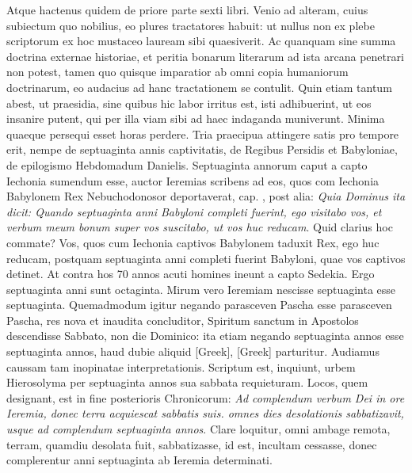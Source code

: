 Atque hactenus quidem de
priore parte sexti libri.
Venio ad alteram, cuius subiectum quo nobilius,
eo plures tractatores habuit: ut nullus non ex plebe scriptorum
ex hoc mustaceo lauream sibi quaesiverit.
Ac quanquam sine
summa doctrina externae historiae, et peritia bonarum literarum
ad ista arcana penetrari non potest, tamen quo quisque imparatior
ab omni copia humaniorum doctrinarum, eo audacius ad hanc
tractationem se contulit.
Quin etiam tantum abest, ut praesidia,
sine quibus hic labor irritus est, isti adhibuerint, ut eos insanire
putent, qui per illa viam sibi ad haec indaganda muniverunt.
Minima quaeque persequi esset horas perdere.
Tria praecipua attingere
satis pro tempore erit, nempe de septuaginta annis captivitatis,
de Regibus Persidis et Babyloniae, de epilogismo Hebdomadum
Danielis.
Septuaginta annorum caput a capto Iechonia sumendum
esse, auctor Ieremias scribens ad eos, quos com Iechonia Babylonem
Rex Nebuchodonosor deportaverat, cap. , post
alia: \textit{Quia Dominus ita dicit: Quando septuaginta anni Babyloni completi
fuerint, ego visitabo vos, et verbum meum bonum super vos
suscitabo, ut vos huc reducam}.
Quid clarius hoc commate?
Vos,
quos cum Iechonia captivos Babylonem taduxit Rex, ego huc
reducam, postquam septuaginta anni completi fuerint Babyloni,
quae vos captivos detinet.
At contra hos 70 annos acuti homines
ineunt a capto Sedekia.
Ergo septuaginta anni sunt octaginta.
Mirum vero Ieremiam nescisse septuaginta esse septuaginta.
Quemadmodum
igitur negando parasceven Pascha esse parasceven
Pascha, res nova et inaudita concluditor, Spiritum sanctum in 
Apostolos descendisse Sabbato, non die Dominico: ita etiam
negando septuaginta annos esse septuaginta annos, haud dubie
aliquid \textgreek{[Greek]}, \textgreek{[Greek]} parturitur.
Audiamus
caussam tam inopinatae interpretationis.
Scriptum est, inquiunt, urbem
Hierosolyma per septuaginta annos sua sabbata requieturam.
Locos, quem designant, est in fine posterioris Chronicorum:
\textit{Ad complendum verbum Dei in ore Ieremia,
 donec terra acquiescat sabbatis
suis. omnes dies desolationis sabbatizavit, usque ad complendum
septuaginta annos}.
Clare loquitur, omni ambage remota, terram,
quamdiu desolata fuit, sabbatizasse, id est, incultam cessasse, donec
complerentur anni septuaginta ab Ieremia determinati.


